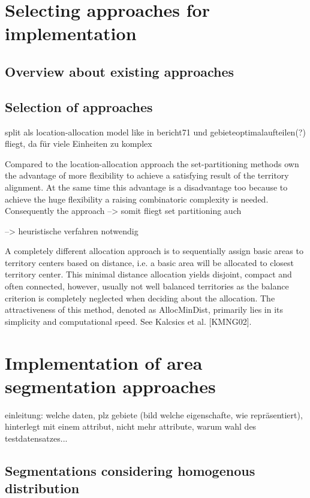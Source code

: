 \section{Selecting approaches for implementation}

\subsection{Overview about existing approaches}\label{Overview about existing approaches}

\subsection{Selection of approaches}

split als location-allocation model like in bericht71 und gebieteoptimalaufteilen(?) fliegt, da für viele Einheiten zu komplex

Compared to the location-allocation approach the set-partitioning methods own the advantage of more flexibility to achieve a satisfying result of the territory alignment. At the same time this advantage is a disadvantage too because to achieve the huge flexibility a raising combinatoric complexity is needed. Consequently the approach 
--> somit fliegt set partitioning auch

--> heuristische verfahren notwendig


A completely different allocation approach is to sequentially assign basic areas to territory
centers based on distance, i.e. a basic area will be allocated to closest territory center. This
minimal distance allocation yields disjoint, compact and often connected, however, usually
not well balanced territories as the balance criterion is completely neglected when deciding
about the allocation. The attractiveness of this method, denoted as AllocMinDist, primarily
lies in its simplicity and computational speed. See Kalcsics et al. [KMNG02].

\section{Implementation of area segmentation approaches}\label{Implementation}

einleitung: welche daten, plz gebiete (bild welche eigenschafte, wie repräsentiert), hinterlegt mit einem attribut, nicht mehr attribute, warum wahl des testdatensatzes...
\subsection{Segmentations considering homogenous distribution}

